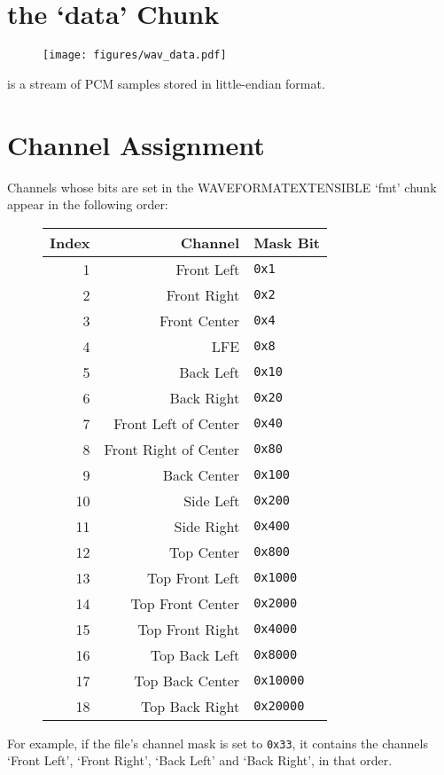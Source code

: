 \section{the `data' Chunk}
\begin{figure}[h]
\texttt{[image: figures/wav\_data.pdf]}
\end{figure}
\par
\noindent
{} is a stream of PCM samples stored in little-endian format.

\pagebreak

\section{Channel Assignment}
\label{wave_channel_assignment}
Channels whose bits are set in the WAVEFORMATEXTENSIBLE `fmt' chunk
appear in the following order:
\begin{figure}[h]
\begin{tabular}{| r | r | l |}
\hline
Index & Channel & Mask Bit \\
\hline
1 & Front Left & \texttt{0x1} \\
2 & Front Right & \texttt{0x2} \\
3 & Front Center & \texttt{0x4} \\
4 & LFE & \texttt{0x8} \\
5 & Back Left & \texttt{0x10} \\
6 & Back Right & \texttt{0x20} \\
7 & Front Left of Center & \texttt{0x40} \\
8 & Front Right of Center & \texttt{0x80} \\
9 & Back Center & \texttt{0x100} \\
10 & Side Left & \texttt{0x200} \\
11 & Side Right & \texttt{0x400} \\
12 & Top Center & \texttt{0x800} \\
13 & Top Front Left & \texttt{0x1000} \\
14 & Top Front Center & \texttt{0x2000} \\
15 & Top Front Right & \texttt{0x4000} \\
16 & Top Back Left & \texttt{0x8000} \\
17 & Top Back Center & \texttt{0x10000} \\
18 & Top Back Right & \texttt{0x20000} \\
\hline
\end{tabular}
\end{figure}
\par
\noindent
For example, if the file's channel mask is set to \texttt{0x33},
it contains the channels `Front Left', `Front Right',
`Back Left' and `Back Right', in that order.
